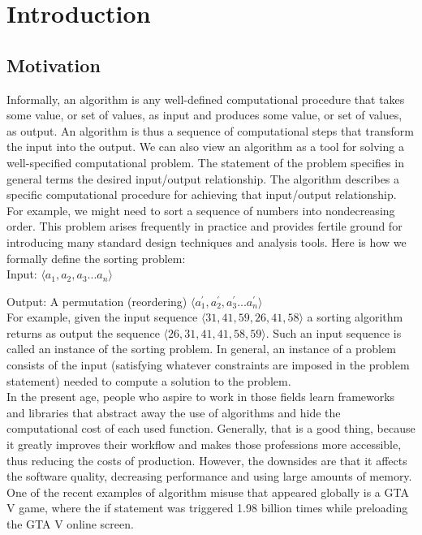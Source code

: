 \chapter{Introduction}\label{ch:intro}
\section{Motivation}
Informally, an algorithm is any well-defined computational procedure that takes some value, or set of values, as input and produces some value, or set of values, as output. An algorithm is thus a sequence of computational steps that transform the input into the output.
We can also view an algorithm as a tool for solving a well-specified computational problem. The statement of the problem specifies in general terms the desired input/output relationship. The algorithm describes a specific computational procedure for achieving that input/output relationship. \\
                    
For example, we might need to sort a sequence of numbers into nondecreasing order. This problem arises frequently in practice and provides fertile ground for introducing many standard design techniques and analysis tools. Here is how we formally define the sorting problem: \\

Input: $\langle a_1, a_2, a_3 ... a_n \rangle$

Output: A permutation (reordering) $\langle a^{'}_1, a^{'}_2, a^{'}_3 ... a^{'}_n \rangle$ \\

For example, given the input sequence $\langle 31, 41, 59, 26, 41, 58 \rangle$ a sorting algorithm returns as output the sequence $\langle 26, 31, 41, 41, 58, 59 \rangle$. Such an input sequence is called an instance of the sorting problem. In general, an instance of a problem consists of the input (satisfying whatever constraints are imposed in the problem statement) needed to compute a solution to the problem. \\

In the present age, people who aspire to work in those fields learn frameworks and libraries that abstract away the use of algorithms and hide the computational cost of each used function. Generally, that is a good thing, because it greatly improves their workflow and makes those professions more accessible, thus reducing the costs of production. However, the downsides are that it affects the software quality, decreasing performance and using large amounts of memory. One of the recent examples of algorithm misuse that appeared globally is a GTA V game, where the if statement was triggered 1.98 billion times while preloading the GTA V online screen.

